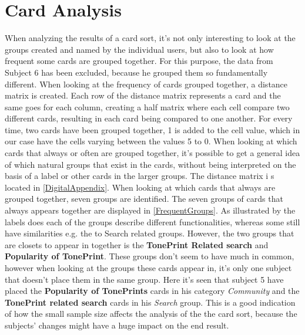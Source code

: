 \section{Card Analysis}
\label{CardAnalysis}
When analyzing the results of a card sort, it's not only interesting to look at the groups created and named by the individual users, but also to look at how frequent some cards are grouped together. For this purpose, the data from Subject 6 has been excluded, because he grouped them so fundamentally different. When looking at the frequency of cards grouped together, a distance matrix is created. Each row of the distance matrix represents a card and the same goes for each column, creating a half matrix where each cell compare two different cards, resulting in each card being compared to one another. For every time, two cards have been grouped together, 1 is added to the cell value, which in our case have the cells varying between the values 5 to 0. When looking at which cards that always or often are grouped together, it's possible to get a general idea of which natural groups that exist in the cards, without being interpreted on the basis of a label or other cards in the larger groups. The distance matrix i s located in \autoref{DigitalAppendix}. When looking at which cards that always are grouped together, seven groups are identified. The seven groups of cards that always appears together are displayed in \autoref{FrequentGroups}. As illustrated by the labels does each of the groups describe different functionalities, whereas some still have similarities e.g. the to Search related groups. However, the two groups that are closets to appear in together is the \textbf{TonePrint Related search} and \textbf{Popularity of TonePrint}. These groups don't seem to have much in common, however when looking at the groups these cards appear in, it's only one subject that doesn't place them in the same group. Here it's seen that subject 5 have placed the \textbf{Popularity of TonePrints} cards in his category \textit{Community} and the \textbf{TonePrint related search} cards in his \textit{Search} group. This is a good indication of how the small sample size affects the analysis of the the card sort, because the subjects' changes might have a huge impact on the end result. 

